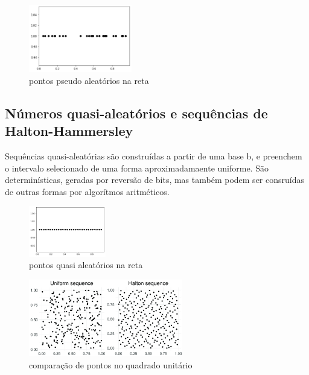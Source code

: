 \documentclass{article}
\begin{document}
\begin{figure}[ht]
\centering
\includegraphics[width=0.4\textwidth]{random_1.png}
\caption{\label{fig:random_1} pontos pseudo aleatórios na reta }
\end{figure}

\newpage

\subsection{Números quasi-aleatórios e sequências de Halton-Hammersley}
Sequências quasi-aleatórias são construídas a partir de uma base b, e preenchem o intervalo selecionado de uma forma aproximadamaente uniforme. São determinísticas, geradas por reversão de bits, mas também podem ser consruídas de outras formas por algorítmos aritméticos.

\begin{figure}[ht]
\centering
\includegraphics[width=0.3\textwidth]{halton_1.png}
\caption{\label{fig:halton_1} pontos quasi aleatórios na reta }
\end{figure}


\begin{figure}[ht]
\centering
\includegraphics[width=0.6\textwidth]{uniforme_halton.png}
\caption{\label{fig:uniforme_halton} comparação de pontos no quadrado unitário }
\end{figure}
\end{document}

